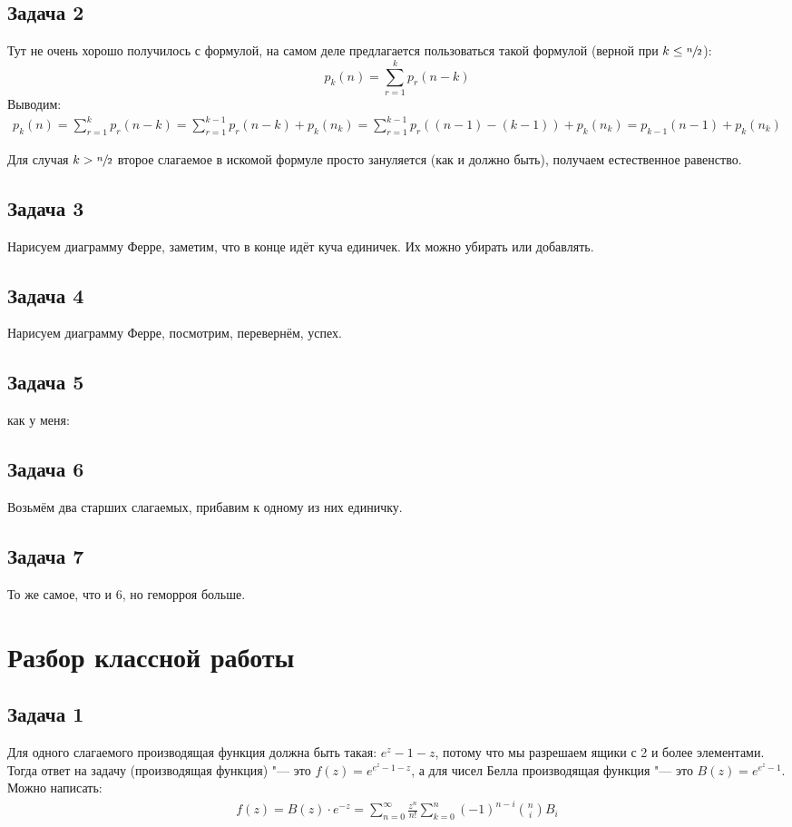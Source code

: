 \subsection{Задача 2}
	Тут не очень хорошо получилось с формулой, на самом деле предлагается пользоваться такой формулой
	(верной при $k \le \sfrac n2$):
	\[
		p_k(n) = \sum_{r=1}^{k} p_r(n-k)
	\]
	Выводим:
	\begin{gather*}
		p_k(n)
			= \sum_{r=1}^{k} p_r(n-k)
			= \sum_{r=1}^{k-1} p_r(n-k) + p_k(n_k)
			= \sum_{r=1}^{k-1} p_r((n-1)-(k-1)) + p_k(n_k)
			= p_{k-1}(n-1) + p_k(n_k)
	\end{gather*}

	Для случая $k>\sfrac n2$ второе слагаемое в искомой формуле просто зануляется (как и должно быть),
	получаем естественное равенство.

\subsection{Задача 3}
	Нарисуем диаграмму Ферре, заметим, что в конце идёт куча единичек.
	Их можно убирать или добавлять.

\subsection{Задача 4}
	Нарисуем диаграмму Ферре, посмотрим, перевернём, успех.

\subsection{Задача 5}
	\TODO как у меня: 

\subsection{Задача 6}
	Возьмём два старших слагаемых, прибавим к одному из них единичку.

\subsection{Задача 7}
	То же самое, что и 6, но геморроя больше.

\section{Разбор классной работы}
\subsection{Задача 1}
	Для одного слагаемого производящая функция должна быть такая: $e^z-1-z$, потому что
	мы разрешаем ящики с 2 и более элементами.
	Тогда ответ на задачу (производящая функция) "--- это $f(z)=e^{e^z-1-z}$, а для
	чисел Белла производящая функция "--- это $B(z)=e^{e^z-1}$.
	Можно написать:
	\begin{gather*}
		f(z) = B(z) \cdot e^{-z} = \sum_{n=0}^{\infty} \frac{z^n}{n!} \sum_{k=0}^n (-1)^{n-i} \binom{n}{i} B_i
	\end{gather*}

